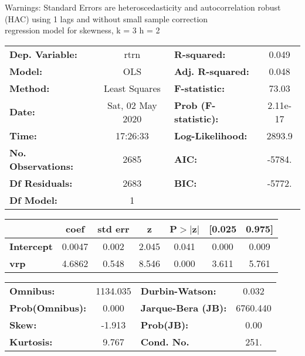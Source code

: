 Warnings: \newline
 [1] Standard Errors are heteroscedasticity and autocorrelation robust (HAC) using 1 lags and without small sample correction\\ 

regression model for skewness, k = 3 h = 2\begin{center}
\begin{tabular}{lclc}
\toprule
\textbf{Dep. Variable:}    &       rtrn       & \textbf{  R-squared:         } &     0.049   \\
\textbf{Model:}            &       OLS        & \textbf{  Adj. R-squared:    } &     0.048   \\
\textbf{Method:}           &  Least Squares   & \textbf{  F-statistic:       } &     73.03   \\
\textbf{Date:}             & Sat, 02 May 2020 & \textbf{  Prob (F-statistic):} &  2.11e-17   \\
\textbf{Time:}             &     17:26:33     & \textbf{  Log-Likelihood:    } &    2893.9   \\
\textbf{No. Observations:} &        2685      & \textbf{  AIC:               } &    -5784.   \\
\textbf{Df Residuals:}     &        2683      & \textbf{  BIC:               } &    -5772.   \\
\textbf{Df Model:}         &           1      & \textbf{                     } &             \\
\bottomrule
\end{tabular}
\begin{tabular}{lcccccc}
                   & \textbf{coef} & \textbf{std err} & \textbf{z} & \textbf{P$> |$z$|$} & \textbf{[0.025} & \textbf{0.975]}  \\
\midrule
\textbf{Intercept} &       0.0047  &        0.002     &     2.045  &         0.041        &        0.000    &        0.009     \\
\textbf{vrp}       &       4.6862  &        0.548     &     8.546  &         0.000        &        3.611    &        5.761     \\
\bottomrule
\end{tabular}
\begin{tabular}{lclc}
\textbf{Omnibus:}       & 1134.035 & \textbf{  Durbin-Watson:     } &    0.032  \\
\textbf{Prob(Omnibus):} &   0.000  & \textbf{  Jarque-Bera (JB):  } & 6760.440  \\
\textbf{Skew:}          &  -1.913  & \textbf{  Prob(JB):          } &     0.00  \\
\textbf{Kurtosis:}      &   9.767  & \textbf{  Cond. No.          } &     251.  \\
\bottomrule
\end{tabular}
\end{center}

